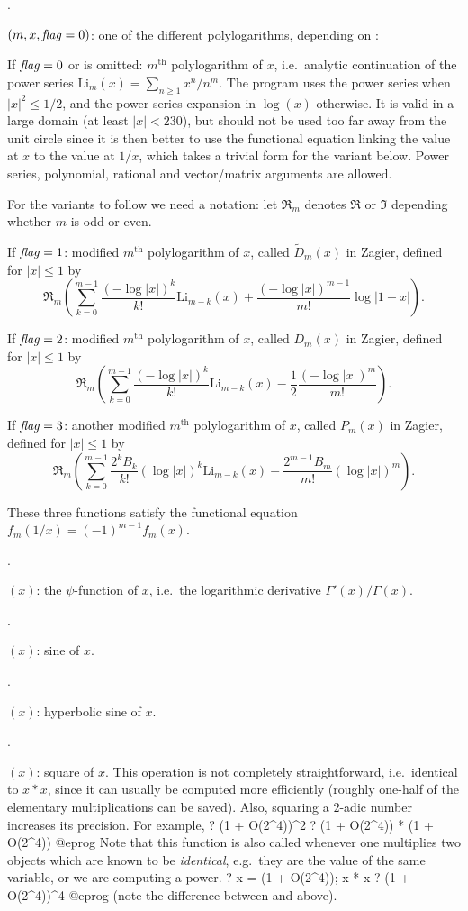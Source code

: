 .

$(m,x,{\hbox{\it f\kern0pt lag\/}=0})$: one of the different polylogarithms,
depending on \fl:

If $\hbox{\it f\kern0pt lag\/}=0$ or is omitted: $m^\text{th}$ polylogarithm of $x$, i.e.~analytic
continuation of the power series $\text{Li}_m(x)=\sum_{n\ge1}x^n/n^m$. The
program uses the power series when $|x|^2\le1/2$, and the power series
expansion in $\log(x)$ otherwise. It is valid in a large domain (at least
$|x|<230$), but should not be used too far away from the unit circle since it
is then better to use the functional equation linking the value at $x$ to the
value at $1/x$, which takes a trivial form for the variant below. Power
series, polynomial, rational and vector/matrix arguments are allowed.

For the variants to follow we need a notation: let $\Re_m$
denotes $\Re$ or $\Im$ depending whether $m$ is odd or even.

If $\hbox{\it f\kern0pt lag\/}=1$: modified $m^\text{th}$ polylogarithm of $x$, called
$\tilde D_m(x)$ in Zagier, defined for $|x|\le1$ by
$$\Re_m\left(\sum_{k=0}^{m-1} \dfrac{(-\log|x|)^k}{k!}\text{Li}_{m-k}(x)
+\dfrac{(-\log|x|)^{m-1}}{m!}\log|1-x|\right).$$

If $\hbox{\it f\kern0pt lag\/}=2$: modified $m^\text{th}$ polylogarithm of $x$,
called $D_m(x)$ in Zagier, defined for $|x|\le1$ by
$$\Re_m\left(\sum_{k=0}^{m-1}\dfrac{(-\log|x|)^k}{k!}\text{Li}_{m-k}(x)
-\dfrac{1}{2}\dfrac{(-\log|x|)^m}{m!}\right).$$

If $\hbox{\it f\kern0pt lag\/}=3$: another modified $m^\text{th}$
polylogarithm of $x$, called $P_m(x)$ in Zagier, defined for $|x|\le1$ by
$$\Re_m\left(\sum_{k=0}^{m-1}\dfrac{2^kB_k}{k!}(\log|x|)^k\text{Li}_{m-k}(x)
-\dfrac{2^{m-1}B_m}{m!}(\log|x|)^m\right).$$

These three functions satisfy the functional equation
$f_m(1/x)=(-1)^{m-1}f_m(x)$.

.

$(x)$: the $\psi$-function of $x$, i.e.~the
logarithmic derivative $\Gamma'(x)/\Gamma(x)$.

.

$(x)$: sine of $x$.

.

$(x)$: hyperbolic sine of $x$.

.

$(x)$: square of $x$. This operation is not completely
straightforward, i.e.~identical to $x * x$, since it can usually be
computed more efficiently (roughly one-half of the elementary
multiplications can be saved). Also, squaring a $2$-adic number increases
its precision. For example,
\bprog
? (1 + O(2^4))^2
? (1 + O(2^4)) * (1 + O(2^4))
@eprog\noindent
Note that this function is also called whenever one multiplies two objects
which are known to be \emph{identical}, e.g.~they are the value of the same
variable, or we are computing a power.
\bprog
? x = (1 + O(2^4)); x * x
? (1 + O(2^4))^4
@eprog
\noindent(note the difference between  and  above).

